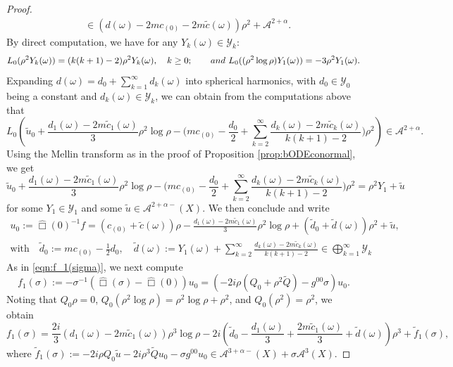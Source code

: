 \documentclass[10pt,a4paper,reqno]{amsart}
\newcommand{\A}{\mathcal{A}}
\theoremstyle{definition}
\theoremstyle{remark}
\numberwithin{equation}{section}
\newcommand{\calY}{\mathcal Y}
\newcommand{\wh}{\widehat}
\begin{document}
\begin{proof}
\[\begin{split}
	&\in (d(\omega) - 2mc_{(0)} -2m\tilde{c}(\omega))\rho^2 + \mathcal{A}^{2+\alpha} .
\end{split}
\]
By direct computation, we have for any $Y_k(\omega)\in\mathcal{Y}_k$:
\[
    L_0(\rho^2 Y_k(\omega)) = (k(k+1) -2)\rho^2 Y_k(\omega),\quad k\geq 0;\qquad {\rm and } \ L_0((\rho^2\log\rho) Y_1(\omega)) = -3\rho^2 Y_1(\omega).
\]
Expanding $d(\omega)=d_0+\sum_{k=1}^{\infty} d_k(\omega)$ into spherical harmonics, with $d_0\in\calY_0$ being a constant and $d_k(\omega)\in\calY_k$, we can obtain from the computations above that
\[
L_0\left(\tilde u_0 +  \frac{d_1(\omega)-2m\tilde{c}_1(\omega)}{3}\rho^2\log\rho - \big( mc_{(0)}-\frac{d_0}{2} + \sum_{k=2}^\infty \frac{d_{k}(\omega)-2m\tilde{c}_k(\omega)}{k(k+1)-2} \big)\rho^2\right) \in \mathcal{A}^{2+\alpha}.
\]
Using the Mellin transform as in the proof of Proposition \ref{prop:bODEconormal}, we get
\[
\tilde u_0 +  \frac{d_1(\omega)-2m\tilde{c}_1(\omega)}{3}\rho^2\log\rho - \big( mc_{(0)}-\frac{d_0}{2} + \sum_{k=2}^\infty \frac{d_{k}(\omega)-2m\tilde{c}_k(\omega)}{k(k+1)-2} \big)\rho^2 = \rho^2   Y_{1} + \tilde u
\]
for some $Y_1\in\mathcal{Y}_1$ and some $\tilde{u} \in \A^{2+\alpha-}(X)$.
We then conclude and write
\[
\begin{gathered}
    u_0 :=\wh\Box(0)^{-1} f = (c_{(0)}+\tilde{c}(\omega))\rho - \frac{d_1(\omega)-2m\tilde{c}_1(\omega)}{3}\rho^2\log\rho + (\tilde{d}_0 + \tilde{d}(\omega))\rho^2 + \tilde{u}, \\
    \text{with}\quad\tilde{d}_0 := mc_{(0)}-\frac12 d_0, \quad \tilde{d}(\omega) := Y_1(\omega) + \sum_{k=2}^\infty \frac{d_{k}(\omega)-2m\tilde{c}_k(\omega)}{k(k+1)-2} \in \bigoplus_{k=1}^\infty \mathcal{Y}_k
\end{gathered}
\]
As in \eqref{eqn:f_1(sigma)}, we next compute
\begin{equation}
\label{f_1(sigma) defn S6}
    f_1(\sigma) := -\sigma^{-1}(\wh\Box(\sigma) - \wh\Box(0)) u_0 = (-2i\rho(Q_0 + \rho^2\widetilde{Q})-g^{00}\sigma)u_0 .
\end{equation}
Noting that $Q_0\rho = 0$, $Q_0(\rho^2\log \rho) = \rho^2 \log\rho + \rho^2$, and $Q_0(\rho^2)=\rho^2$, we obtain
\begin{equation}
\label{f_1(sigma) expansion S6}
    f_1(\sigma) = \frac{2i}{3}(d_1(\omega)-2m\tilde{c}_1(\omega))\rho^3\log\rho - 2i(\tilde{d}_0 -\frac{d_1(\omega)}{3}+\frac{2m\tilde{c}_1(\omega)}{3}+\tilde{d}(\omega))\rho^3 + \tilde{f}_1(\sigma),
\end{equation}
where $\tilde{f}_1(\sigma) := -2i\rho Q_0 \tilde{u} - 2i\rho^3\widetilde{Q}u_0 - \sigma g^{00}u_0 \in \A^{3+\alpha-}(X) + \sigma \A^3(X)$.


\end{proof}
\end{document}
